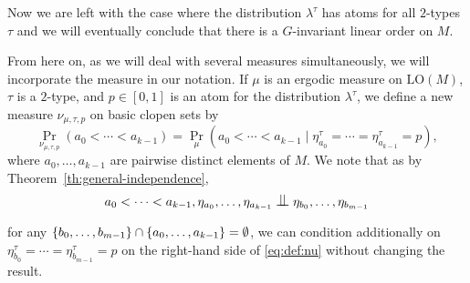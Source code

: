 \documentclass[JEP,XML,SOM,Unicode,published]{cedram}
\theoremstyle{plain}
\theoremstyle{definition}
\DeclarePairedDelimiter\set{\{}{\}}
\newcommand{\LO}{\mathrm{LO}}
\newcommand{\indep}[1][]{%
  \mathrel{
    \mathop{
      \scalebox{1}[1.3]{\text{$\perp\!\!\!\perp$}}
    }\displaylimits_{#1}
  }
}
\begin{document}
Now we are left with the case where the distribution $\lambda^\tau$ has atoms for all $2$-types~$\tau$ and we will eventually conclude that there is a $G$-invariant linear order on $M$.

From here on, as we will deal with several measures simultaneously, we will incorporate the measure in our notation. If $\mu$ is an ergodic measure on $\LO(M)$, $\tau$ is a $2$-type, and $p \in [0, 1]$ is an atom for the distribution $\lambda^\tau$, we define a new measure $\nu_{\mu, \tau, p}$ on basic clopen sets by
\begin{equation}
\label{eq:def:nu}
\Pr_{\nu_{\mu, \tau, p}}(a_0 < \cdots < a_{k-1}) = \Pr_\mu(a_0 < \cdots < a_{k-1} \mid \eta_{a_0}^\tau = \cdots = \eta_{a_{k-1}}^\tau = p),
\end{equation}
where $a_0, \ldots, a_{k-1}$ are pairwise distinct elements of $M$. We note that as by Theorem~\ref{th:general-independence},
\begin{equation*}
a_0 < \cdots < a_{k-1}, \eta_{a_0}, \ldots, \eta_{a_{k-1}} \indep \eta_{b_0}, \ldots, \eta_{b_{m-1}}
\end{equation*}
for any $\set{b_0, \ldots, b_{m-1}} \cap \set{a_0, \ldots, a_{k-1}} = \emptyset$, we can condition additionally on $\eta_{b_0}^\tau = \cdots = \eta_{b_{m-1}}^\tau = p$ on the right-hand side of \eqref{eq:def:nu} without changing the result.
\end{document}

